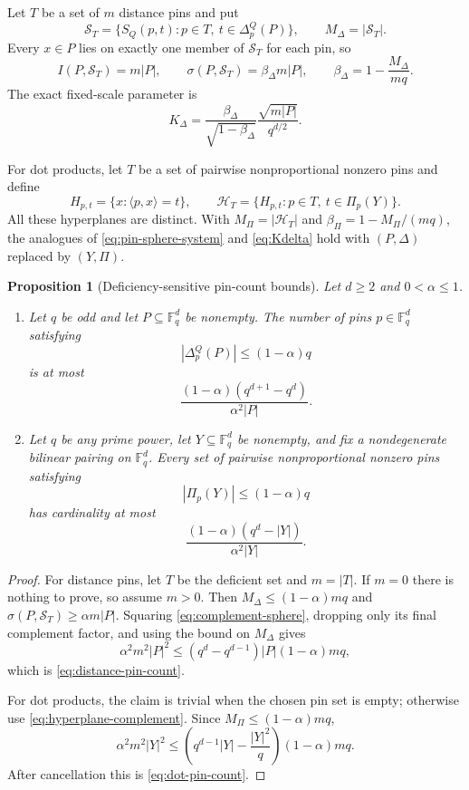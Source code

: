 \documentclass[11pt,letterpaper]{amsart}
\newtheorem{proposition}[proposition]{Proposition}
\theoremstyle{definition}
\theoremstyle{remark}
\newcommand{\1}{\mathbf 1}
\begin{document}
Let $T$ be a set of $m$ distance pins and put
\[
 \mathcal S_T=\{S_Q(p,t):p\in T,\ t\in\Delta_p^Q(P)\},
 \qquad M_\Delta=|\mathcal S_T|.
\]
Every $x\in P$ lies on exactly one member of $\mathcal S_T$ for each pin, so
\begin{equation}\label{eq:pin-sphere-system}
 I(P,\mathcal S_T)=m|P|,
 \qquad
 \sigma(P,\mathcal S_T)=\beta_\Delta m|P|,
 \qquad
 \beta_\Delta=1-\frac{M_\Delta}{mq}.
\end{equation}
The exact fixed-scale parameter is
\begin{equation}\label{eq:Kdelta}
 K_\Delta
 =\frac{\beta_\Delta}{\sqrt{1-\beta_\Delta}}
 \frac{\sqrt{m|P|}}{q^{d/2}}.
\end{equation}

For dot products, let $T$ be a set of pairwise nonproportional nonzero pins and define
\[
 H_{p,t}=\{x:\langle p,x\rangle=t\},
 \qquad
 \mathcal H_T=\{H_{p,t}:p\in T,\ t\in\Pi_p(Y)\}.
\]
All these hyperplanes are distinct.  With $M_\Pi=|\mathcal H_T|$ and $\beta_\Pi=1-M_\Pi/(mq)$, the analogues of \eqref{eq:pin-sphere-system} and \eqref{eq:Kdelta} hold with $(P,\Delta)$ replaced by $(Y,\Pi)$.

\begin{proposition}[Deficiency-sensitive pin-count bounds]\label{prop:pin-counts}
Let $d\ge2$ and $0<\alpha\le1$.
\begin{enumerate}[label=\textup{(\arabic*)}]
\item Let $q$ be odd and let $P\subseteq\mathbb F_q^d$ be nonempty.  The number of pins $p\in\mathbb F_q^d$ satisfying
\[
 |\Delta_p^Q(P)|\le(1-\alpha)q
\]
is at most
\begin{equation}\label{eq:distance-pin-count}
 \frac{(1-\alpha)(q^{d+1}-q^d)}{\alpha^2|P|}.
\end{equation}
\item Let $q$ be any prime power, let $Y\subseteq\mathbb F_q^d$ be nonempty, and fix a nondegenerate bilinear pairing on $\mathbb F_q^d$.  Every set of pairwise nonproportional nonzero pins satisfying
\[
 |\Pi_p(Y)|\le(1-\alpha)q
\]
has cardinality at most
\begin{equation}\label{eq:dot-pin-count}
 \frac{(1-\alpha)(q^d-|Y|)}{\alpha^2|Y|}.
\end{equation}
\end{enumerate}
\end{proposition}

\begin{proof}
For distance pins, let $T$ be the deficient set and $m=|T|$.  If $m=0$ there is nothing to prove, so assume $m>0$.  Then $M_\Delta\le(1-\alpha)mq$ and $\sigma(P,\mathcal S_T)\ge\alpha m|P|$.  Squaring \eqref{eq:complement-sphere}, dropping only its final complement factor, and using the bound on $M_\Delta$ gives
\[
 \alpha^2m^2|P|^2
 \le(q^d-q^{d-1})|P|(1-\alpha)mq,
\]
which is \eqref{eq:distance-pin-count}.

For dot products, the claim is trivial when the chosen pin set is empty; otherwise use \eqref{eq:hyperplane-complement}.  Since $M_\Pi\le(1-\alpha)mq$,
\[
 \alpha^2m^2|Y|^2
 \le\left(q^{d-1}|Y|-\frac{|Y|^2}{q}\right)(1-\alpha)mq.
\]
After cancellation this is \eqref{eq:dot-pin-count}.
\end{proof}
\end{document}
